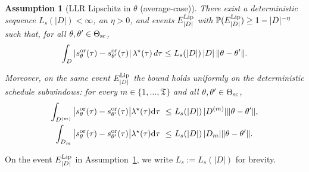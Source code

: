 \documentclass{statsoc}
\newtheorem{assumption}[assumption]{Assumption}
\newcommand{\dd}{\mathrm{d}}
\newcommand{\1}{\mathbbm{1}}
\newcommand{\Tmax}{\mathfrak{T}}
\begin{document}
\begin{assumption}[LLR Lipschitz in $\theta$ (average-case)]\label{ass:G5}
There exist a deterministic sequence $L_s(|D|)<\infty$, an $\eta>0$, and events $E^{\rm Lip}_{|D|}$ with $\mathbb{P}(E^{\rm Lip}_{|D|})\ge 1-|D|^{-\eta}$ such that, for all $\theta,\theta'\in\Theta_{\rm sc}$,
\[
\int_D |s^{\rm or}_\theta(\tau)-s^{\rm or}_{\theta'}(\tau)|\,\lambda^\star(\tau)\,d\tau
\le L_s(|D|)\,|D|\,\|\theta-\theta'\|.
\]

Moreover, on the same event $E^{\rm Lip}_{|D|}$ the bound holds uniformly on the deterministic schedule subwindows:
for every $m\in\{1,\dots,\Tmax\}$ and all $\theta,\theta'\in\Theta_{\rm sc}$,
\begin{align*}
\int_{D^{(m)}} \big| s^{\rm or}_\theta(\tau)-s^{\rm or}_{\theta'}(\tau) \big| \lambda^\star(\tau) \dd\tau
\ \le&\ L_s(|D|)\, |D^{(m)}| \|\theta-\theta'\|,\\
\int_{D_m} \big| s^{\rm or}_\theta(\tau)-s^{\rm or}_{\theta'}(\tau) \big| \lambda^\star(\tau) \dd\tau
\ \le&\ L_s(|D|)\, |D_m| \|\theta-\theta'\|.
\end{align*}

\end{assumption}

On the event $E^{\rm Lip}_{|D|}$ in Assumption~\ref{ass:G5}, we write $L_s:=L_s(|D|)$ for brevity.
\end{document}
